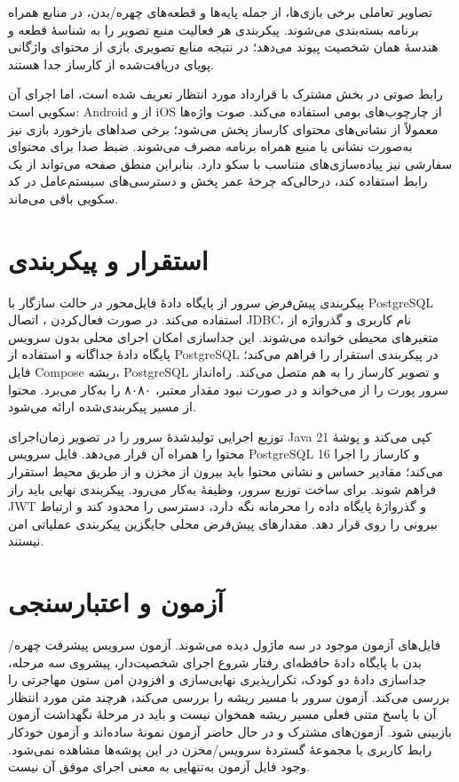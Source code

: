 تصاویر تعاملی برخی بازی‌ها، از جمله پایه‌ها و قطعه‌های چهره/بدن، در منابع همراه برنامه بسته‌بندی می‌شوند. پیکربندی هر فعالیت منبع تصویر را به شناسهٔ قطعه و هندسهٔ همان شخصیت پیوند می‌دهد؛ در نتیجه منابع تصویری بازی از محتوای واژگانی پویای دریافت‌شده از کارساز جدا هستند.

رابط صوتی در بخش مشترک با قرارداد مورد انتظار  تعریف شده است، اما اجرای آن سکویی است: Android از  و iOS از چارچوب‌های بومی  استفاده می‌کند. صوت واژه‌ها معمولاً از نشانی‌های محتوای کارساز پخش می‌شود؛ برخی صداهای بازخورد بازی نیز به‌صورت نشانی یا منبع همراه برنامه مصرف می‌شوند. ضبط صدا برای محتوای سفارشی نیز پیاده‌سازی‌های متناسب با سکو دارد. بنابراین منطق صفحه می‌تواند از یک رابط استفاده کند، درحالی‌که چرخهٔ عمر پخش و دسترسی‌های سیستم‌عامل در کد سکویی باقی می‌ماند.

\section{استقرار و پیکربندی}

پیکربندی پیش‌فرض سرور از پایگاه دادهٔ فایل‌محور  در حالت سازگار با PostgreSQL استفاده می‌کند. در صورت فعال‌کردن ، اتصال JDBC، نام کاربری و گذرواژه از متغیرهای محیطی خوانده می‌شوند. این جداسازی امکان اجرای محلی بدون سرویس پایگاه دادهٔ جداگانه و استفاده از PostgreSQL در پیکربندی استقرار را فراهم می‌کند؛ فایل Compose ریشه، PostgreSQL و تصویر کارساز را به هم متصل می‌کند. راه‌انداز سرور پورت را از  می‌خواند و در صورت نبود مقدار معتبر، ۸۰۸۰ را به‌کار می‌برد. محتوا از مسیر پیکربندی‌شده ارائه می‌شود.

 توزیع اجرایی تولیدشدهٔ سرور را در تصویر زمان‌اجرای Java 21 کپی می‌کند و پوشهٔ محتوا را همراه آن قرار می‌دهد. فایل  سرویس PostgreSQL 16 و کارساز را اجرا می‌کند؛ مقادیر حساس و نشانی محتوا باید بیرون از مخزن و از طریق محیط استقرار فراهم شوند. برای ساخت توزیع سرور، وظیفهٔ  به‌کار می‌رود. پیکربندی نهایی باید راز JWT و گذرواژهٔ پایگاه داده را محرمانه نگه دارد، دسترسی  را محدود کند و ارتباط بیرونی را روی  قرار دهد. مقدارهای پیش‌فرض محلی جایگزین پیکربندی عملیاتی امن نیستند.

\section{آزمون و اعتبارسنجی}

فایل‌های آزمون موجود در سه ماژول دیده می‌شوند. آزمون سرویس پیشرفت چهره/بدن با پایگاه دادهٔ حافظه‌ای رفتار شروع اجرای شخصیت‌دار، پیشروی سه مرحله، جداسازی دادهٔ دو کودک، تکرارپذیری نهایی‌سازی و افزودن امن ستون مهاجرتی را بررسی می‌کند. آزمون سرور با  مسیر ریشه را بررسی می‌کند، هرچند متن مورد انتظار آن با پاسخ متنی فعلی مسیر ریشه همخوان نیست و باید در مرحلهٔ نگهداشت آزمون بازبینی شود. آزمون‌های مشترک  و  در حال حاضر آزمون نمونهٔ ساده‌اند و آزمون خودکار رابط کاربری یا مجموعهٔ گستردهٔ سرویس/مخزن در این پوشه‌ها مشاهده نمی‌شود. وجود فایل آزمون به‌تنهایی به معنی اجرای موفق آن نیست.

